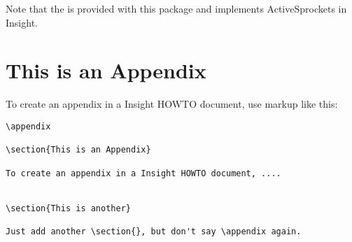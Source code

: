 \documentclass{InsightHowto}
\begin{document}
Note that the  is provided with this package and
implements ActiveSprockets in Insight.





\appendix

\section{This is an Appendix}

To create an appendix in a Insight HOWTO document, use markup like
this:

\begin{verbatim}
\appendix

\section{This is an Appendix}

To create an appendix in a Insight HOWTO document, ....


\section{This is another}

Just add another \section{}, but don't say \appendix again.
\end{verbatim}
\end{document}
